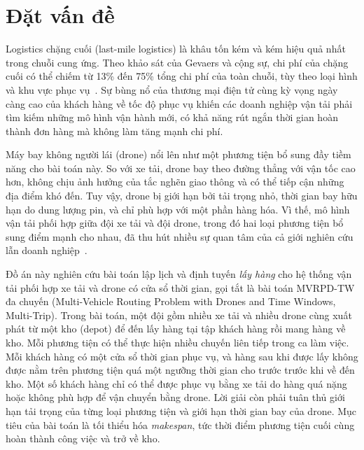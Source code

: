 \documentclass[../DoAn.tex]{subfiles}
\begin{document}
\section{Đặt vấn đề}
\label{sec:dvd}

Logistics chặng cuối (last-mile logistics) là khâu tốn kém và kém hiệu quả nhất trong chuỗi cung ứng. Theo khảo sát của Gevaers và cộng sự, chi phí của chặng cuối có thể chiếm từ 13\% đến 75\% tổng chi phí của toàn chuỗi, tùy theo loại hình và khu vực phục vụ~\cite{gevaers2011characteristics}. Sự bùng nổ của thương mại điện tử cùng kỳ vọng ngày càng cao của khách hàng về tốc độ phục vụ khiến các doanh nghiệp vận tải phải tìm kiếm những mô hình vận hành mới, có khả năng rút ngắn thời gian hoàn thành đơn hàng mà không làm tăng mạnh chi phí.

Máy bay không người lái (drone) nổi lên như một phương tiện bổ sung đầy tiềm năng cho bài toán này. So với xe tải, drone bay theo đường thẳng với vận tốc cao hơn, không chịu ảnh hưởng của tắc nghẽn giao thông và có thể tiếp cận những địa điểm khó đến. Tuy vậy, drone bị giới hạn bởi tải trọng nhỏ, thời gian bay hữu hạn do dung lượng pin, và chỉ phù hợp với một phần hàng hóa. Vì thế, mô hình vận tải phối hợp giữa đội xe tải và đội drone, trong đó hai loại phương tiện bổ sung điểm mạnh cho nhau, đã thu hút nhiều sự quan tâm của cả giới nghiên cứu lẫn doanh nghiệp~\cite{chung2020optimization, macrina2020drone}.

Đồ án này nghiên cứu bài toán lập lịch và định tuyến \textit{lấy hàng} cho hệ thống vận tải phối hợp xe tải và drone có cửa sổ thời gian, gọi tắt là bài toán MVRPD-TW đa chuyến (Multi-Vehicle Routing Problem with Drones and Time Windows, Multi-Trip). Trong bài toán, một đội gồm nhiều xe tải và nhiều drone cùng xuất phát từ một kho (depot) để đến lấy hàng tại tập khách hàng rồi mang hàng về kho. Mỗi phương tiện có thể thực hiện nhiều chuyến liên tiếp trong ca làm việc. Mỗi khách hàng có một cửa sổ thời gian phục vụ, và hàng sau khi được lấy không được nằm trên phương tiện quá một ngưỡng thời gian cho trước trước khi về đến kho. Một số khách hàng chỉ có thể được phục vụ bằng xe tải do hàng quá nặng hoặc không phù hợp để vận chuyển bằng drone. Lời giải còn phải tuân thủ giới hạn tải trọng của từng loại phương tiện và giới hạn thời gian bay của drone. Mục tiêu của bài toán là tối thiểu hóa \textit{makespan}, tức thời điểm phương tiện cuối cùng hoàn thành công việc và trở về kho.
\end{document}
